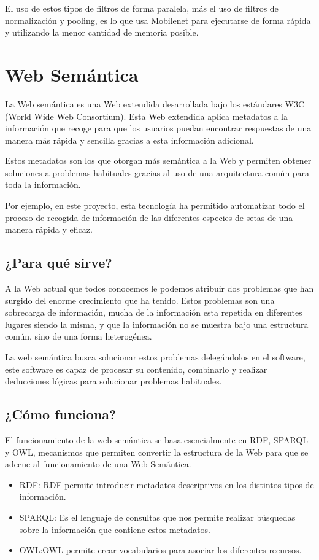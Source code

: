 El uso de estos tipos de filtros de forma paralela, más el uso de filtros de normalización y pooling, es lo que usa Mobilenet para ejecutarse de forma rápida y utilizando la menor cantidad de memoria posible.



\section{Web Semántica}

La Web semántica es una Web extendida desarrollada bajo los estándares W3C (World Wide Web Consortium). Esta Web extendida aplica metadatos a la información que recoge para que los usuarios puedan encontrar respuestas de una manera más rápida y sencilla gracias a esta información adicional.\cite{webSemantica} 

Estos metadatos son los que otorgan más semántica a la Web y permiten obtener soluciones a problemas habituales gracias al uso de una arquitectura común para toda la información. 

Por ejemplo, en este proyecto, esta tecnología ha permitido automatizar todo el proceso de recogida de información de las diferentes especies de setas de una manera rápida y eficaz.

\subsection{¿Para qué sirve?}

A la Web actual que todos conocemos le podemos atribuir dos problemas que han surgido del enorme crecimiento que ha tenido. Estos problemas son una sobrecarga de información, mucha de la información esta repetida en diferentes lugares siendo la misma, y que la información no se muestra bajo una estructura común, sino de una forma heterogénea.

La web semántica busca solucionar estos problemas delegándolos en el software, este software es capaz de procesar su contenido, combinarlo y realizar deducciones lógicas para solucionar problemas habituales.

\subsection{¿Cómo funciona?}

El funcionamiento de la web semántica se basa esencialmente en RDF, SPARQL y OWL, mecanismos que permiten convertir la estructura de la Web para que se adecue al funcionamiento de una Web Semántica.
\begin{itemize}
	\item{RDF}: RDF permite introducir metadatos descriptivos en los distintos tipos de información.
	\item{SPARQL}: Es el lenguaje de consultas que nos permite realizar búsquedas sobre la información que contiene estos metadatos.
	\item{OWL}:OWL permite crear vocabularios para asociar los diferentes recursos.
\end{itemize}

